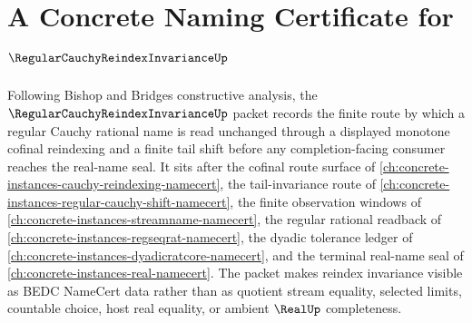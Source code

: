 \chapter{A Concrete Naming Certificate for $\RegularCauchyReindexInvarianceUp$}
\label{ch:concrete-instances-regular-cauchy-reindex-invariance-namecert}

Following Bishop and Bridges constructive analysis, the $\RegularCauchyReindexInvarianceUp$ packet records the finite route by which a regular Cauchy rational name is read unchanged through a displayed monotone cofinal reindexing and a finite tail shift before any completion-facing consumer reaches the real-name seal. It sits after the cofinal route surface of \autoref{ch:concrete-instances-cauchy-reindexing-namecert}, the tail-invariance route of \autoref{ch:concrete-instances-regular-cauchy-shift-namecert}, the finite observation windows of \autoref{ch:concrete-instances-streamname-namecert}, the regular rational readback of \autoref{ch:concrete-instances-regseqrat-namecert}, the dyadic tolerance ledger of \autoref{ch:concrete-instances-dyadicratcore-namecert}, and the terminal real-name seal of \autoref{ch:concrete-instances-real-namecert}. The packet makes reindex invariance visible as BEDC NameCert data rather than as quotient stream equality, selected limits, countable choice, host real equality, or ambient $\RealUp$ completeness.

